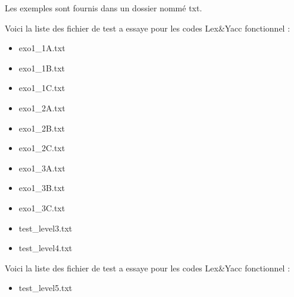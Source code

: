 
Les exemples sont fournis dans un dossier nommé txt.

Voici la liste des fichier de test a essaye pour les codes Lex&Yacc fonctionnel :

\begin{itemize}
    \item exo1\_1A.txt
    \item exo1\_1B.txt 
    \item exo1\_1C.txt 
    \item exo1\_2A.txt
    \item exo1\_2B.txt
    \item exo1\_2C.txt
    \item exo1\_3A.txt
    \item exo1\_3B.txt
    \item exo1\_3C.txt
    \item test\_level3.txt
    \item test\_level4.txt
\end{itemize}

Voici la liste des fichier de test a essaye pour les codes Lex&Yacc fonctionnel :
\begin{itemize}
    \item test\_level5.txt
\end{itemize}

\newpage